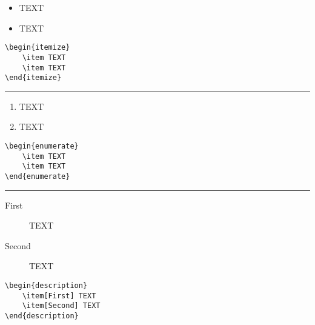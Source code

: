 \pagebreak
{}

\begin{multicols}{2}
\begin{itemize} 
	\item TEXT
	\item TEXT
\end{itemize}

\noindent\begin{minipage}{\linewidth}
\begin{lstlisting}
\begin{itemize} 
	\item TEXT
	\item TEXT
\end{itemize}
\end{lstlisting}
\end{minipage}
\end{multicols}

\hrule

\begin{multicols}{2}
\begin{enumerate} 
	\item TEXT
	\item TEXT
\end{enumerate}

\noindent\begin{minipage}{\linewidth}
\begin{lstlisting}
\begin{enumerate} 
	\item TEXT
	\item TEXT
\end{enumerate}
\end{lstlisting}
\end{minipage}
\end{multicols}

\hrule

\begin{multicols}{2}

\begin{description} 
	\item[First] TEXT
	\item[Second] TEXT
\end{description}

\noindent\begin{minipage}{\linewidth}
\begin{lstlisting}
\begin{description} 
	\item[First] TEXT
	\item[Second] TEXT
\end{description}
\end{lstlisting}
\end{minipage}
\end{multicols}

